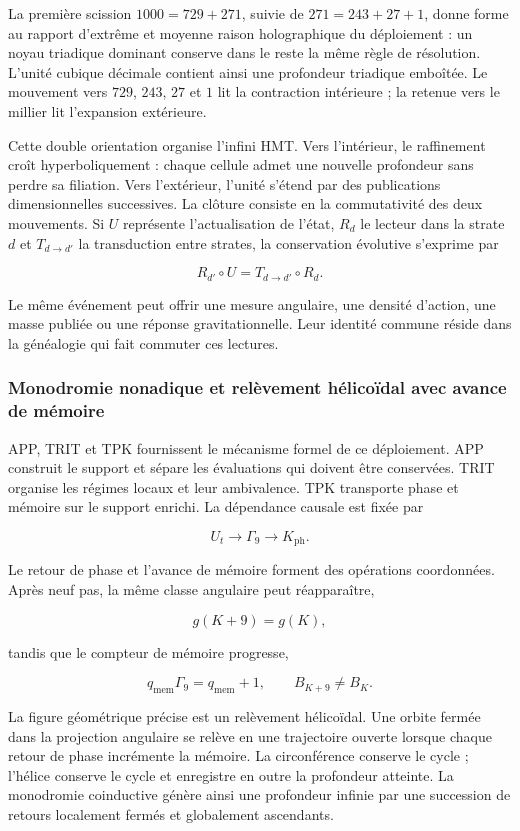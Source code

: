 La première scission \(1000=729+271\), suivie de \(271=243+27+1\), donne forme au rapport d'extrême et moyenne raison holographique du déploiement : un noyau triadique dominant conserve dans le reste la même règle de résolution. L'unité cubique décimale contient ainsi une profondeur triadique emboîtée. Le mouvement vers \(729\), \(243\), \(27\) et \(1\) lit la contraction intérieure ; la retenue vers le millier lit l'expansion extérieure.

Cette double orientation organise l'infini HMT. Vers l'intérieur, le raffinement croît hyperboliquement : chaque cellule admet une nouvelle profondeur sans perdre sa filiation. Vers l'extérieur, l'unité s'étend par des publications dimensionnelles successives. La clôture consiste en la commutativité des deux mouvements. Si \(U\) représente l'actualisation de l'état, \(R_d\) le lecteur dans la strate \(d\) et \(T_{d\to d'}\) la transduction entre strates, la conservation évolutive s'exprime par

\[
R_{d'}\circ U
=
T_{d\to d'}\circ R_d.
\]

Le même événement peut offrir une mesure angulaire, une densité d'action, une masse publiée ou une réponse gravitationnelle. Leur identité commune réside dans la généalogie qui fait commuter ces lectures.

\subsubsection{Monodromie nonadique et relèvement hélicoïdal avec avance de mémoire}

APP, TRIT et TPK fournissent le mécanisme formel de ce déploiement. APP construit le support et sépare les évaluations qui doivent être conservées. TRIT organise les régimes locaux et leur ambivalence. TPK transporte phase et mémoire sur le support enrichi. La dépendance causale est fixée par

\[
U_t\longrightarrow \Gamma_9\longrightarrow K_{\mathrm{ph}}.
\]

Le retour de phase et l'avance de mémoire forment des opérations coordonnées. Après neuf pas, la même classe angulaire peut réapparaître,

\[
g(K+9)=g(K),
\]

tandis que le compteur de mémoire progresse,

\[
q_{\mathrm{mem}}\Gamma_9=q_{\mathrm{mem}}+1,
\qquad
B_{K+9}\neq B_K.
\]

La figure géométrique précise est un relèvement hélicoïdal. Une orbite fermée dans la projection angulaire se relève en une trajectoire ouverte lorsque chaque retour de phase incrémente la mémoire. La circonférence conserve le cycle ; l'hélice conserve le cycle et enregistre en outre la profondeur atteinte. La monodromie coinductive génère ainsi une profondeur infinie par une succession de retours localement fermés et globalement ascendants.

